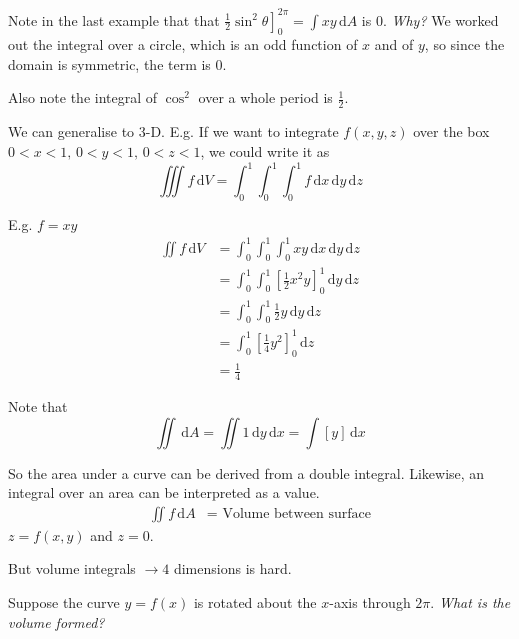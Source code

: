 \documentclass[10pt]{scrartcl}
\begin{document}
Note in the last example that that $\left.\frac{1}{2}\sin^2\theta\right]_0^{2\pi} = \int xy \,\mathrm{d}A$ is $0$. \emph{Why?} We worked out the integral over a circle, which is an odd function of $x$ and of $y$, so since the domain is symmetric, the term is $0$. 

Also note the integral of $\cos^2$ over a whole period is $\frac{1}{2}$.


We can generalise to 3-D. E.g. If we want to integrate $f(x,y,z)$ over the box $0 < x < 1,\, 0< y< 1,\, 0 < z < 1$, we could write it as
\[
  \iiint f\,\mathrm{d}V = \int_0^1 \int_0^1 \int_0^1 f\,\mathrm{d}x\,\mathrm{d}y\,\mathrm{d}z
\]
\begin{example}
E.g. $f = xy$
\begin{align*}
  \iint f\,\mathrm{d}V &= \int_0^1 \int_0^1 \int_0^1 xy\,\mathrm{d}x\,\mathrm{d}y\,\mathrm{d}z\\
  &= \int_0^1 \int_0^1 \left[\frac{1}{2}x^2y\right]_0^1\,\mathrm{d}y\,\mathrm{d}z\\
  &= \int_0^1 \int_0^1 \frac{1}{2}y\,\mathrm{d}y\,\mathrm{d}z\\
  &= \int_0^1 \left[\frac{1}{4}y^2\right]_0^1\,\mathrm{d}z\\
  &= \frac{1}{4}
\end{align*}

\end{example}


Note that 
\[
  \iint \,\mathrm{d}A = \iint 1\,\mathrm{d}y\,\mathrm{d}x = \int [y] \,\mathrm{d}x
\]

So the area under a curve can be derived from a double integral. Likewise, an integral over an area can be interpreted as a value. 
\begin{align*}
  \iint f\,\mathrm{d}A &= \text{ Volume between surface}
\end{align*}
$z = f(x,y)$ and $z = 0$. 

But volume integrals $\longrightarrow 4$ dimensions is hard.\\


Suppose the curve $y= f(x)$ is rotated about the $x$-axis through $2\pi$. \emph{What is the volume formed?} 
\end{document}
